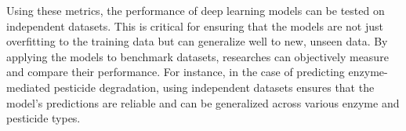 Using these metrics, the performance of deep learning models can be tested on independent datasets. This is critical for ensuring that the models are not just overfitting to the training data but can generalize well to new, unseen data. By applying the models to benchmark datasets, researches can objectively measure and compare their performance. For instance, in the case of predicting enzyme-mediated pesticide degradation, using independent datasets ensures that the model’s predictions are reliable and can be generalized across various enzyme and pesticide types.